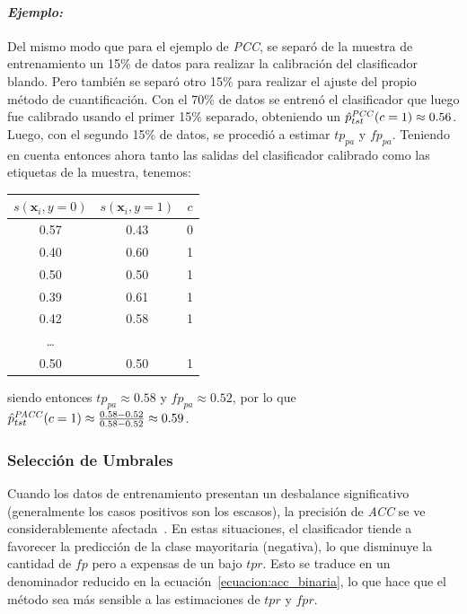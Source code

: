 \paragraph{\it Ejemplo:\/} Del mismo modo que para el ejemplo de {\it PCC}, se
separó de la muestra de entrenamiento un 15\% de datos para realizar la
calibración del clasificador blando. Pero también se separó otro 15\% para
realizar el ajuste del propio método de cuantificación. Con el 70\% de datos se
entrenó el clasificador que luego fue calibrado usando el primer 15\% separado,
obteniendo un $\hat p^{\it{PCC}}_{tst}(c=1) \approx 0.56$. Luego, con el segundo
15\% de datos, se procedió a estimar $tp_{pa}$ y $fp_{pa}$. Teniendo en cuenta
entonces ahora tanto las salidas del clasificador calibrado como las etiquetas
de la muestra, tenemos:
\begin{center}
    \begin{tabular}{ccc}
        \toprule
        $s(\boldsymbol{x}_i, y=0)$ &  $s(\boldsymbol{x}_i, y=1)$ &  $c$ \\
        \midrule
        0.57 &    0.43 &  0 \\
        0.40 &    0.60 &  1 \\
        0.50 &    0.50 &  1 \\
        0.39 &    0.61 &  1 \\
        0.42 &    0.58 &  1 \\
        \ldots              \\
        0.50 &    0.50 &  1 \\
     \bottomrule
        \bottomrule
        \end{tabular}
\end{center}

siendo entonces $tp_{pa} \approx 0.58$ y $fp_{pa} \approx 0.52$, por lo que
$\hat p^{\it{PACC}}_{tst}(c=1) \approx \frac{0.58-0.52}{0.58-0.52} \approx
0.59$.

\subsubsection{Selección de Umbrales}\label{puntual:umbrales}

Cuando los datos de entrenamiento presentan un desbalance significativo
(generalmente los casos positivos son los escasos), la precisión de {\it ACC\/}
se ve considerablemente afectada~\cite{forman2006quantifying}. En estas
situaciones, el clasificador tiende a favorecer la predicción de la clase
mayoritaria (negativa), lo que disminuye la cantidad de $fp$ pero a expensas de
un bajo $tpr$. Esto se traduce en un denominador reducido en la
ecuación~\ref{ecuacion:acc_binaria}, lo que hace que el método sea más sensible
a las estimaciones de $tpr$ y $fpr$.

